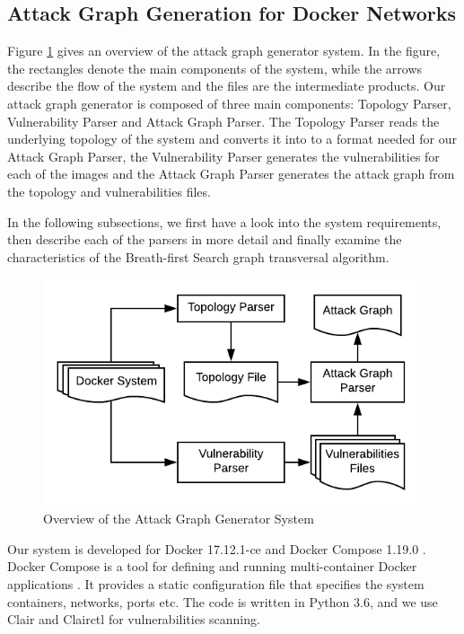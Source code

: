 \subsection{Attack Graph Generation for Docker Networks}
\label{chap:technical}
 Figure \ref{AttackGraphSystem} gives an overview of the attack graph generator system. In the figure, the rectangles denote the main components of the system, while the arrows describe the flow of the system and the files are the intermediate products. Our attack graph generator is composed of three main components: Topology Parser, Vulnerability Parser and Attack Graph Parser. The Topology Parser reads the underlying topology of the system and converts it into to a format needed for our Attack Graph Parser, the Vulnerability Parser generates the vulnerabilities for each of the images and the Attack Graph Parser generates the attack graph from the topology and vulnerabilities files. 

In the following subsections, we first have a look into the system requirements, then describe each of the parsers in more detail and finally examine the characteristics of the Breath-first Search graph transversal algorithm.

\begin{figure}
	\includegraphics[scale=0.9]{./images/AttackGraphSystem}
	\caption{Overview of the Attack Graph Generator System}
	\label{AttackGraphSystem}
\end{figure}

Our system is developed for Docker 17.12.1-ce and Docker Compose 1.19.0 \cite{merkel2014docker}. Docker Compose is a tool for defining and running multi-container Docker applications \cite{dockercompose}. It provides a static configuration file that specifies the system containers, networks, ports etc. The code is written in Python 3.6, and we use Clair \cite{clair} and Clairctl \cite{clairctl} for vulnerabilities scanning.

